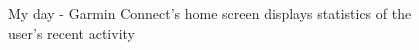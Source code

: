 \begin{figure}[h]
    \centering
        \caption{My day - Garmin Connect's home screen displays statistics of the user's recent activity\cite{garmin-my-day-img}}
        \label{garmin-my-day-img}
\end{figure}

